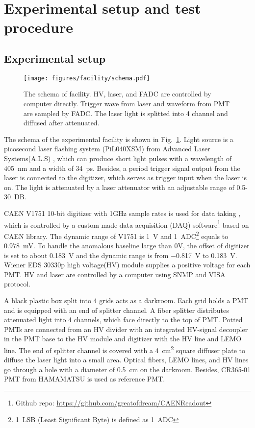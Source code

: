 \section{Experimental setup and test procedure}
\label{SetUp}
\subsection{Experimental setup}
\label{sec:setup}
\begin{figure}[!htbp]
    \centering
    \texttt{[image: figures/facility/schema.pdf]}
    \caption{The schema of facility. HV, laser, and FADC are controlled by computer directly. Trigger wave from laser and waveform from PMT are sampled by FADC. The laser light is splitted into 4 channel and diffused after attenuated.}
    \label{fig:facility}
\end{figure}

The schema of the experimental facility is shown in Fig.~\ref{fig:facility}. Light source is a picosecond laser flashing system (PiL040XSM) from Advanced Laser Systems(A.L.S) \cite{NTKLaser}, which can produce short light pulses with a wavelength of \SI{405}{nm} and a width of \SI{34}{ps}. Besides, a period trigger signal output from the laser is connected to the digitizer, which serves as trigger input when the laser is on. The light is attenuated by a laser attenuator with an adjustable range of 0.5-30\ DB.

CAEN V1751 10-bit digitizer with 1GHz sample rates is used for data taking \cite{CAENV1751}, which is controlled by a custom-made data acquisition (DAQ) software\footnote{Github repo: \url{https://github.com/greatofdream/CAENReadout}} based on CAEN library. The dynamic range of V1751 is \SI{1}{V} and \SI{1}{ADC}\footnote{\SI{1}{LSB} (Least Significant Byte) is defined as \SI{1}{ADC}} equals to \SI{0.978}{mV}. To handle the anomalous baseline large than 0V, the offset of digitizer is set to about \SI{0.183}{V} and the dynamic range is from \SI{-0.817}{V} to \SI{0.183}{V}. Wiener EDS 30330p high voltage(HV) module \cite{WIENERHV} supplies a positive voltage for each PMT. HV and laser are controlled by a computer using SNMP\cite{SNMP} and VISA\cite{VISA} protocol.

A black plastic box split into 4 grids acts as a darkroom. Each grid holds a PMT and is equipped with an end of splitter channel. A fiber splitter %
distributes attenuated light into 4 channels, which face directly to the top of PMT. Potted PMTs are connected from an HV divider with an integrated HV-signal decoupler in the PMT base to the HV module and digitizer with the HV line and LEMO line. The end of splitter channel is covered with a \SI{4}{cm\tothe{2}} square diffuser plate to diffuse the laser light into a small area. Optical fibers, LEMO lines, and HV lines go through a hole with a diameter of \SI{0.5}{cm} on the darkroom. Besides, CR365-01 \cite{BJBS} PMT from HAMAMATSU is used as reference PMT.

